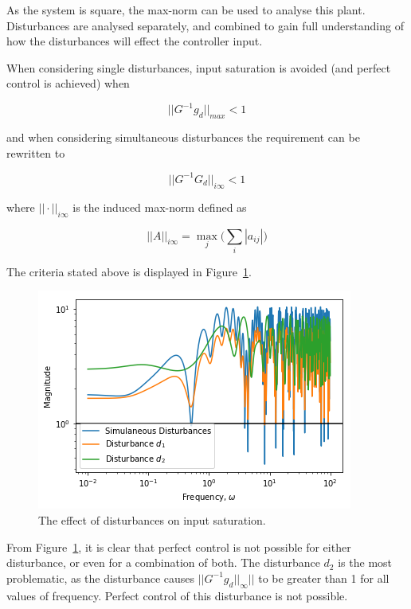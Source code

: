 As the system is square, the max-norm can be used to analyse this plant. Disturbances are analysed separately, and combined to gain full understanding of how the disturbances will effect the controller input. 

When considering single disturbances, input saturation is avoided (and perfect control is achieved) when

\begin{equation}
	||G^{-1} g_d||_{max} < 1 
\end{equation} 

and when considering simultaneous disturbances the requirement can be rewritten to

\begin{equation}
	||G^{-1} G_d||_{i\infty} < 1
\end{equation} 

where $||\cdot||_{i\infty}$ is the induced max-norm defined as

\begin{equation}
	||A||_{i\infty} = \max_{j} \Big(\sum_{i}|a_{ij}|\Big)
\end{equation}

The criteria stated above is displayed in Figure~\ref{fig:disturbance-analysis-2-max-norm}.

\begin{figure}[H]
	\centering
	\includegraphics[width=0.7\linewidth]{"Figures/Disturbance Analysis 2 Max Norm"}
	\caption{The effect of disturbances on input saturation.}
	\label{fig:disturbance-analysis-2-max-norm}
\end{figure}

From Figure~\ref{fig:disturbance-analysis-2-max-norm}, it is clear that perfect control is not possible for either disturbance, or even for a combination of both. The disturbance $d_2$ is the most problematic, as the disturbance causes $||G^{-1}g_d||_{\infty}||$ to be greater than 1 for all values of frequency. Perfect control of this disturbance is not possible. 

